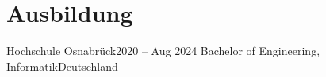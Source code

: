 \documentclass[letterpaper,11pt]{article}
\begin{document}
\section{Ausbildung}
  \resumeSubHeadingListStart
    \resumeSubheading
      {Hochschule Osnabrück}{2020 -- Aug 2024}
      {Bachelor of Engineering, Informatik}{Deutschland}
      \resumeItemListStart
      \resumeItemListEnd
  \resumeSubHeadingListEnd
\end{document}
